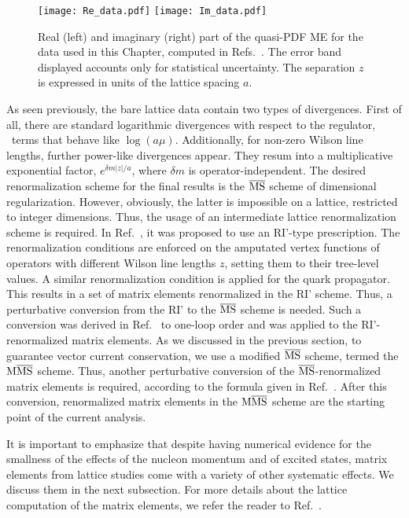 \begin{figure}[t!]
    \begin{center}
        \texttt{[image: Re\_data.pdf]}
        \texttt{[image: Im\_data.pdf]}
        \caption{Real (left) and imaginary (right) part 
        of the quasi-PDF ME for the data used in this Chapter, computed in Refs.~\cite{Alexandrou:2018pbm, Alexandrou:2019lfo}.
        The error band displayed accounts only for statistical uncertainty.
        The separation $z$ is expressed in units of the lattice spacing $a$.} 
        \label{fig::data} 
    \end{center}
\end{figure}
%
As seen previously, the bare lattice data contain two types of divergences. First of all, there are
standard logarithmic divergences with respect to the regulator, \ie\ terms that
behave like $\log(a\mu)$. Additionally, for non-zero Wilson line lengths,
further power-like divergences appear. They resum into a multiplicative
exponential factor, $e^{\delta m |z|/a}$, where $\delta m$ is
operator-independent. The desired renormalization scheme for the final results
is the $\overline{\mathrm{MS}}$ scheme of dimensional regularization. However, obviously, the
latter is impossible on a lattice, restricted to integer dimensions. Thus, the
usage of an intermediate lattice renormalization scheme is required. In
Ref.~\cite{Alexandrou:2017huk}, it was proposed to use an RI'-type prescription.
The renormalization conditions are enforced on the amputated vertex functions of
operators with different Wilson line lengths $z$, setting them to their
tree-level values. A similar renormalization condition is applied for the quark
propagator. This results in a set of matrix elements renormalized in the RI'
scheme. Thus, a perturbative conversion from the RI' to the $\overline{\mathrm{MS}}$ scheme is
needed. Such a conversion was derived in Ref.~\cite{Constantinou:2017sej} to
one-loop order and was applied to the RI'-renormalized matrix elements. As we
discussed in the previous section, to guarantee vector current conservation, we
use a modified $\overline{\mathrm{MS}}$ scheme, termed the ${\rm M}\overline{\mathrm{MS}}$ scheme. Thus, another
perturbative conversion of the $\overline{\mathrm{MS}}$-renormalized matrix elements is required,
according to the formula given in Ref.~\cite{Alexandrou:2019lfo}. After this
conversion, renormalized matrix elements in the ${\rm M}\overline{\mathrm{MS}}$ scheme are the starting
point of the current analysis.

It is important to emphasize that despite having numerical evidence for the
smallness of the effects of the nucleon momentum and of excited states, matrix
elements from lattice studies come with a variety of other systematic effects.
We discuss them in the next subsection. For more details about the lattice
computation of the matrix elements, we refer the reader to
Ref.~\cite{Alexandrou:2019lfo}.


